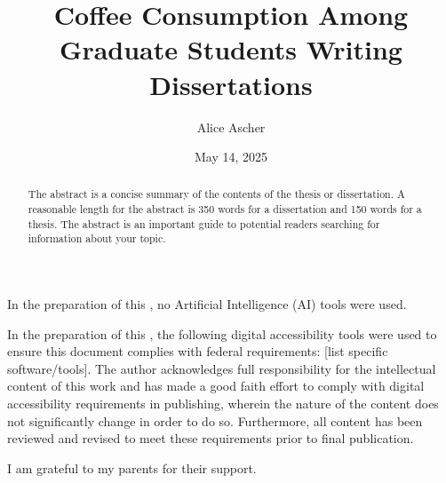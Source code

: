 \documentclass[bibstyle=phys,ragged]{authesis}
\title{Coffee Consumption Among Graduate Students Writing Dissertations}
\author{Alice Ascher}
\date{May 14, 2025}
\begin{document}
\begin{frontmatter}
\maketitle

\begin{abstract}
The abstract is a concise summary of the contents of the thesis or dissertation.
A reasonable length for the abstract is 350 words for a dissertation and 150 words
for a thesis. The abstract is an important guide to potential readers searching for
information about your topic.
\end{abstract}

\begin{aidisclosure}
%
In the preparation of this {\thesistype}, no Artificial Intelligence (AI) tools were used.
\end{aidisclosure}

\begin{accessibilitydisclosure}
In the preparation of this {\thesistype}, the following digital
accessibility tools were used to ensure this document complies with federal
requirements: [list specific software/tools]. The author acknowledges full responsibility
for the intellectual content of this work and has made a good faith effort to comply with
digital accessibility requirements in publishing, wherein the nature of the content does
not significantly change in order to do so. Furthermore, all content has been reviewed
and revised to meet these requirements prior to final publication.
\end{accessibilitydisclosure}

\begin{acknowledgements}
I am grateful to my parents for their support.
\end{acknowledgements}


\end{frontmatter}
\end{document}
